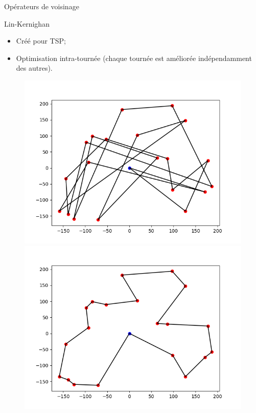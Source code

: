 \documentclass{beamer}
\begin{document}
\begin{frame}{Opérateurs de voisinage}
\begin{block}{Lin-Kernighan}
\begin{itemize}
\item Créé pour TSP;
\item Optimisation intra-tournée (chaque tournée est améliorée indépendamment des autres).
\end{itemize}
\end{block}
\begin{figure}
	\centering
	\includegraphics[scale=0.3]{test4_20_init.png}
	\includegraphics[scale=0.3]{test4_20_LKopt.png}
\end{figure} 
\end{frame}
\end{document}

